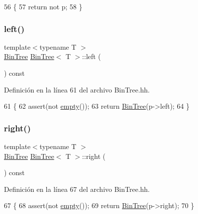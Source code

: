 \begin{DoxyCode}
56                         \{
57         \textcolor{keywordflow}{return} not p;
58     \}
\end{DoxyCode}
\mbox{\label{class_bin_tree_a82108db4c1b08d1f111027788c196d4e}} 
\subsubsection{\texorpdfstring{left()}{left()}}
{\footnotesize\ttfamily template$<$typename T $>$ \\
\mbox{\hyperlink{class_bin_tree}{Bin\+Tree}} \mbox{\hyperlink{class_bin_tree}{Bin\+Tree}}$<$ T $>$\+::left (\begin{DoxyParamCaption}{ }\end{DoxyParamCaption}) const}



Definición en la línea 61 del archivo Bin\+Tree.\+hh.


\begin{DoxyCode}
61                           \{
62         assert(not \mbox{\hyperlink{class_bin_tree_a74cda259ba5c25b8ee38ed4dc33e4fad}{empty}}());
63         \textcolor{keywordflow}{return} \mbox{\hyperlink{class_bin_tree_a47eef22d29cd023449d97c073c08e5b6}{BinTree}}(p->left);
64     \}
\end{DoxyCode}
\mbox{\label{class_bin_tree_aff8e96651b27284c329667b5ad3e4d0b}} 
\subsubsection{\texorpdfstring{right()}{right()}}
{\footnotesize\ttfamily template$<$typename T $>$ \\
\mbox{\hyperlink{class_bin_tree}{Bin\+Tree}} \mbox{\hyperlink{class_bin_tree}{Bin\+Tree}}$<$ T $>$\+::right (\begin{DoxyParamCaption}{ }\end{DoxyParamCaption}) const}



Definición en la línea 67 del archivo Bin\+Tree.\+hh.


\begin{DoxyCode}
67                            \{
68         assert(not \mbox{\hyperlink{class_bin_tree_a74cda259ba5c25b8ee38ed4dc33e4fad}{empty}}());
69         \textcolor{keywordflow}{return} \mbox{\hyperlink{class_bin_tree_a47eef22d29cd023449d97c073c08e5b6}{BinTree}}(p->right);
70     \}
\end{DoxyCode}
\mbox{\label{class_bin_tree_a734e785b089c87b49187ee7c58edf5f3}} 
